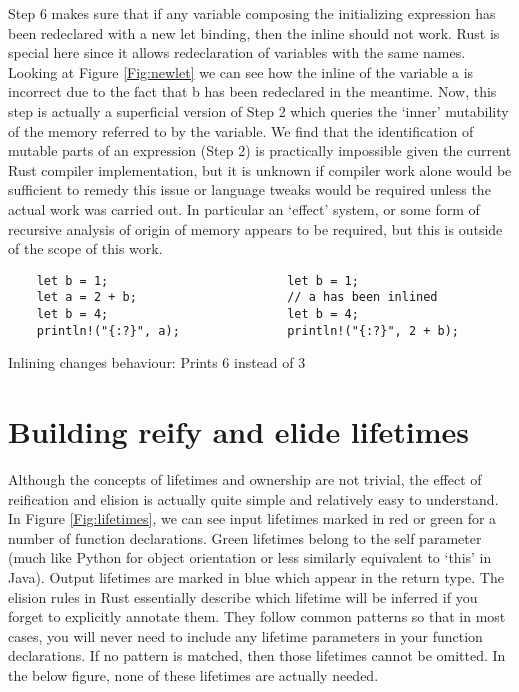 Step 6 makes sure that if any variable composing the initializing expression has been redeclared with a new let binding, then the inline should not work. Rust is special here since it allows redeclaration of variables with the same names. Looking at Figure \ref{Fig:newlet} we can see how the inline of the variable a is incorrect due to the fact that b has been redeclared in the meantime. Now, this step is actually a superficial version of Step 2 which queries the `inner' mutability of the memory referred to by the variable. We find that the identification of mutable parts of an expression (Step 2) is practically impossible given the current Rust compiler implementation, but it is unknown if compiler work alone would be sufficient to remedy this issue or language tweaks would be required unless the actual work was carried out. In particular an `effect' system, or some form of recursive analysis of origin of memory appears to be required, but this is outside of the scope of this work.

\begin{fig}[H]
\begin{verbatim}
    let b = 1;                         let b = 1;
    let a = 2 + b;                     // a has been inlined
    let b = 4;                         let b = 4;
    println!("{:?}", a);               println!("{:?}", 2 + b);
\end{verbatim}
\caption{Inlining changes behaviour: Prints 6 instead of 3}
\label{Fig:newlet}
\end{fig}


\section{Building reify and elide lifetimes}\label{S:buildreielide}
Although the concepts of lifetimes and ownership are not trivial, the effect of reification and elision is actually quite simple and relatively easy to understand. In Figure \ref{Fig:lifetimes}, we can see input lifetimes marked in red or green for a number of function declarations. Green lifetimes belong to the self parameter (much like Python for object orientation or less similarly equivalent to `this' in Java). Output lifetimes are marked in blue which appear in the return type. The elision rules in Rust essentially describe which lifetime will be inferred if you forget to explicitly annotate them. They follow common patterns so that in most cases, you will never need to include any lifetime parameters in your function declarations. If no pattern is matched, then those lifetimes cannot be omitted. In the below figure, none of these lifetimes are actually needed.

